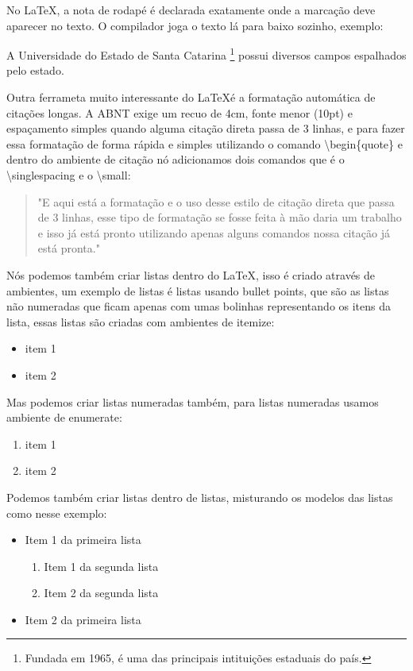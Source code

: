 No \LaTeX, a nota de rodapé é declarada exatamente onde a marcação deve aparecer no texto. O compilador joga o texto lá para baixo sozinho, exemplo:

A Universidade do Estado de Santa Catarina \footnote{Fundada em 1965, é uma das principais intituições estaduais do país.} possui diversos campos espalhados pelo estado.

Outra ferrameta muito interessante do \LaTeX é a formatação automática de citações longas. A ABNT exige um recuo de 4cm, fonte menor (10pt) e espaçamento simples quando alguma citação direta passa de 3 linhas, e para fazer essa formatação de forma rápida e simples utilizando o comando \textbackslash begin\{quote\} e dentro do ambiente de citação nó adicionamos dois comandos que é o \textbackslash singlespacing e o \textbackslash small:
\begin{quote}
    \small
    "E aqui está a formatação e o uso desse estilo de citação direta que passa de 3 linhas, esse tipo de formatação se fosse feita à mão daria um trabalho e isso já está pronto utilizando apenas alguns comandos nossa citação já está pronta."
\end{quote}

Nós podemos também criar listas dentro do \LaTeX, isso é criado através de ambientes, um exemplo de listas é listas usando bullet points, que são as listas não numeradas que ficam apenas com umas bolinhas representando os itens da lista, essas listas são criadas com ambientes de itemize:

\begin{itemize}
    \item item 1
    \item item 2
\end{itemize}

Mas podemos criar listas numeradas também, para listas numeradas usamos ambiente de enumerate:

\begin{enumerate}
    \item item 1
    \item item 2
\end{enumerate}

Podemos também criar listas dentro de listas, misturando os modelos das listas como nesse exemplo:

\begin{itemize}
    \item Item 1 da primeira lista
    \begin{enumerate}
        \item Item 1 da segunda lista
        \item Item 2 da segunda lista
    \end{enumerate}
    \item Item 2 da primeira lista
\end{itemize}

